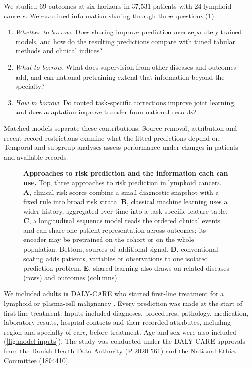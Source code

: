 We studied 69 outcomes at six horizons in 37,531 patients with 24 lymphoid
cancers. We examined information sharing through three questions
(\cref{fig:paradigms}).
\begin{enumerate}[leftmargin=1.5em,itemsep=2pt,topsep=3pt]
  \item \emph{Whether to borrow.} Does sharing improve prediction over
  separately trained models, and how do the resulting predictions compare
  with tuned tabular methods and clinical indices?
  \item \emph{What to borrow.} What does supervision from other diseases and
  outcomes add, and can national pretraining extend that information beyond
  the specialty?
  \item \emph{How to borrow.} Do routed task-specific corrections improve
  joint learning, and does adaptation improve transfer from national records?
\end{enumerate}
Matched models separate these contributions. Source removal, attribution and
recent-record restrictions examine what the fitted predictions depend on.
Temporal and subgroup analyses assess performance under changes in patients
and available records.

\clearpage
\begin{figure}[H]
  \centering
  \resizebox{\textwidth}{!}{}\par\vspace{3mm}
  \resizebox{\textwidth}{!}{}
  \caption{\textbf{Approaches to risk prediction and the information each
  can use.} Top, three approaches to risk prediction in lymphoid cancers.
  \textbf{A}, clinical risk scores combine a small diagnostic snapshot with a
  fixed rule into broad risk strata. \textbf{B}, classical machine learning
  uses a wider history, aggregated over time into a task-specific feature
  table. \textbf{C}, a longitudinal sequence model reads the ordered clinical
  events and can share one patient representation across outcomes; its
  encoder may be pretrained on the cohort or on the whole population. Bottom,
  sources of additional signal. \textbf{D}, conventional scaling adds patients,
  variables or observations to one isolated prediction problem. \textbf{E},
  shared learning also draws on related diseases (rows) and outcomes
  (columns).}
  \label{fig:paradigms}
\end{figure}

\clearpage
{}

We included adults in DALY-CARE who started first-line treatment for a lymphoid
or plasma-cell malignancy \citep{brieghel2025dalycare}. Every prediction was made
at the start of first-line treatment. Inputs included diagnoses, procedures,
pathology, medication, laboratory results, hospital contacts and their recorded
attributes, including region and specialty of care, before treatment. Age and
sex were also included (\cref{fig:model-inputs}). The study was conducted under the DALY-CARE approvals from the Danish Health
Data Authority (P-2020-561) and the National Ethics Committee (1804410).

